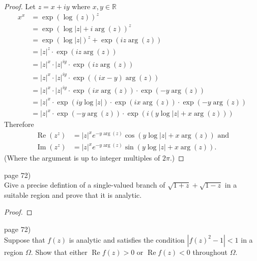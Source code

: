 \documentclass{article}
\newenvironment{problem}[2][Problem]{\begin{trivlist}
\item[\hskip \labelsep {\bfseries #1}\hskip \labelsep {\bfseries #2.}]}{\end{trivlist}}
\begin{document}
\begin{proof}
  Let $z = x + iy$ where $x,y\in\mathbb{R}$
  \begin{align*}
    x^x &= \exp(\log(z))^z \\
    &= \exp(\log|z| + i\arg(z))^z \\
    &= \exp(\log|z|)^z + \exp(iz\arg(z)) \\
    &= |z|^z \cdot \exp(iz\arg(z)) \\
    &= |z|^x \cdot |z|^{iy} \cdot \exp(iz\arg(z)) \\
    &= |z|^x \cdot |z|^{iy} \cdot \exp((ix-y)\arg(z)) \\
    &= |z|^x \cdot |z|^{iy} \cdot \exp(ix\arg(z)) \cdot \exp(-y\arg(z)) \\
    &= |z|^x \cdot \exp(iy\log|z|) \cdot \exp(ix\arg(z)) \cdot \exp(-y\arg(z)) \\
    &= |z|^x \cdot \exp(-y\arg(z)) \cdot \exp(i(y\log|z| + x\arg(z)))
  \end{align*}
  Therefore \begin{align*}
    \operatorname{Re}(z^z) &= |z|^x e^{-y\arg(z)} \cos(y\log|z| + x\arg(z)) \text{ and}\\
    \operatorname{Im}(z^z) &= |z|^x e^{-y\arg(z)} \sin(y\log|z| + x\arg(z)).
  \end{align*}
  (Where the argument is up to integer multiples of $2\pi$.)
\end{proof}
\pagebreak

\begin{problem}{1} (page 72) \\
  Give a precise defintion of a single-valued branch of
  $\sqrt{1 + z} + \sqrt{1 - z}$
  in a suitable region and prove that it is analytic.
\end{problem}

\begin{proof}
\end{proof}


\pagebreak

\begin{problem}{3} (page 72) \\
  Suppose that $f(z)$ is analytic and satisfies the condition $|f(z)^2 - 1| < 1$
  in a region $\Omega$.
  Show that either $\operatorname{Re} f(z) > 0$ or $\operatorname{Re} f(z) < 0$
  throughout $\Omega$.
\end{problem}
\end{document}
